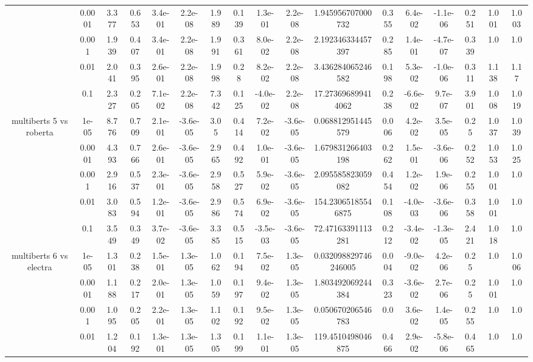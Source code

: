 \begin{tabular}{|c|c|c|c|c|c|c|c|c|c|c|c|c|c|c|c|c|}
 & 0.0001 & 3.377 & 0.653 & 3.4e-01 & 2.2e-08 & 1.989 & 0.139 & 1.3e-01 & 2.2e-08 & 1.945956707000732 & 0.355 & 6.4e-02 & -1.1e-06 & 0.251 & 1.001 & 1.003 \\
 & 0.001 & 1.939 & 0.407 & 3.4e-01 & 2.2e-08 & 1.991 & 0.361 & 8.0e-02 & 2.2e-08 & 2.192346334457397 & 0.285 & 1.4e-01 & -4.7e-07 & 0.339 & 1.0 & 1.0 \\
 & 0.01 & 2.041 & 0.395 & 2.6e-01 & 2.2e-08 & 1.998 & 0.28 & 8.2e-02 & 2.2e-08 & 3.436284065246582 & 0.198 & 5.3e-02 & -1.0e-06 & 0.311 & 1.138 & 1.17 \\
 & 0.1 & 2.327 & 0.205 & 7.1e-02 & 2.2e-08 & 7.342 & 0.125 & -4.0e-02 & 2.2e-08 & 17.273696899414062 & 0.238 & -6.6e-02 & 9.7e-07 & 3.901 & 1.008 & 1.019 \\
\hline
\multirow{5}{*}{multiberts 5 vs roberta } & 1e-05 & 8.776 & 0.709 & 2.1e-01 & -3.6e-05 & 3.05 & 0.414 & 7.2e-02 & -3.6e-05 & 0.068812951445579 & 0.006 & 4.2e-02 & 3.5e-05 & 0.25 & 1.037 & 1.039 \\
 & 0.0001 & 4.393 & 0.766 & 2.6e-01 & -3.6e-05 & 2.965 & 0.492 & 1.0e-01 & -3.6e-05 & 1.679831266403198 & 0.262 & 1.5e-01 & -3.6e-06 & 0.252 & 1.053 & 1.025 \\
 & 0.001 & 2.916 & 0.537 & 2.3e-01 & -3.6e-05 & 2.958 & 0.527 & 5.9e-02 & -3.6e-05 & 2.095585823059082 & 0.454 & 1.2e-02 & 1.9e-06 & 0.255 & 1.001 & 1.0 \\
 & 0.01 & 3.083 & 0.594 & 1.2e-01 & -3.6e-05 & 2.986 & 0.574 & 6.9e-02 & -3.6e-05 & 154.23065185546875 & 0.108 & -4.0e-03 & -3.6e-06 & 0.358 & 1.001 & 1.0 \\
 & 0.1 & 3.549 & 0.349 & 3.7e-02 & -3.6e-05 & 3.385 & 0.515 & -3.5e-03 & -3.6e-05 & 72.47163391113281 & 0.212 & -3.4e-02 & -1.3e-05 & 2.421 & 1.018 & 1.0 \\
\hline
\multirow{5}{*}{multiberts 6 vs electra } & 1e-05 & 1.301 & 0.238 & 1.5e-01 & 1.3e-05 & 1.062 & 0.194 & 7.5e-02 & 1.3e-05 & 0.032098829746246005 & 0.004 & -9.0e-02 & 4.2e-06 & 0.25 & 1.0 & 1.006 \\
 & 0.0001 & 1.188 & 0.217 & 2.0e-01 & 1.3e-05 & 1.059 & 0.197 & 9.4e-02 & 1.3e-05 & 1.803492069244384 & 0.323 & -3.6e-02 & 2.7e-06 & 0.25 & 1.001 & 1.0 \\
 & 0.001 & 1.095 & 0.205 & 2.2e-01 & 1.3e-05 & 1.102 & 0.192 & 9.5e-02 & 1.3e-05 & 0.050670206546783 & 0.0 & 3.6e-02 & 1.4e-05 & 0.255 & 1.0 & 1.0 \\
 & 0.01 & 1.204 & 0.192 & 1.3e-01 & 1.3e-05 & 1.305 & 0.199 & 1.1e-01 & 1.3e-05 & 119.4510498046875 & 0.466 & 2.9e-02 & -5.8e-06 & 0.465 & 1.0 & 1.0 \\

\end{tabular}
